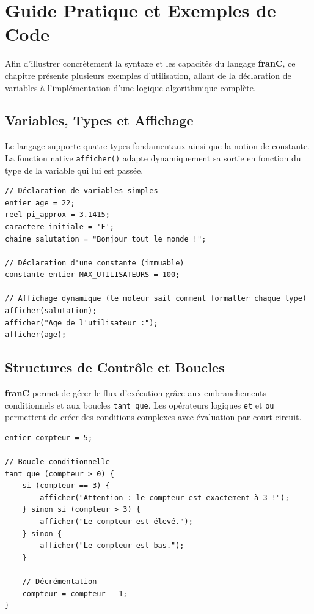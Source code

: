 \documentclass[pfe ,titlesmallcaps]{isi_report}
\begin{document}
\chapter{Guide Pratique et Exemples de Code}

Afin d'illustrer concrètement la syntaxe et les capacités du langage \textbf{franC}, ce chapitre présente plusieurs exemples d'utilisation, allant de la déclaration de variables à l'implémentation d'une logique algorithmique complète.

\section{Variables, Types et Affichage}
Le langage supporte quatre types fondamentaux ainsi que la notion de constante. La fonction native \texttt{afficher()} adapte dynamiquement sa sortie en fonction du type de la variable qui lui est passée.

\begin{verbatim}
// Déclaration de variables simples
entier age = 22;
reel pi_approx = 3.1415;
caractere initiale = 'F';
chaine salutation = "Bonjour tout le monde !";

// Déclaration d'une constante (immuable)
constante entier MAX_UTILISATEURS = 100;

// Affichage dynamique (le moteur sait comment formatter chaque type)
afficher(salutation);
afficher("Age de l'utilisateur :");
afficher(age);
\end{verbatim}

\section{Structures de Contrôle et Boucles}
\textbf{franC} permet de gérer le flux d'exécution grâce aux embranchements conditionnels et aux boucles \texttt{tant\_que}. Les opérateurs logiques \texttt{et} et \texttt{ou} permettent de créer des conditions complexes avec évaluation par court-circuit.

\begin{verbatim}
entier compteur = 5;

// Boucle conditionnelle
tant_que (compteur > 0) {
    si (compteur == 3) {
        afficher("Attention : le compteur est exactement à 3 !");
    } sinon si (compteur > 3) {
        afficher("Le compteur est élevé.");
    } sinon {
        afficher("Le compteur est bas.");
    }
    
    // Décrémentation
    compteur = compteur - 1;
}
\end{verbatim}
\end{document}
